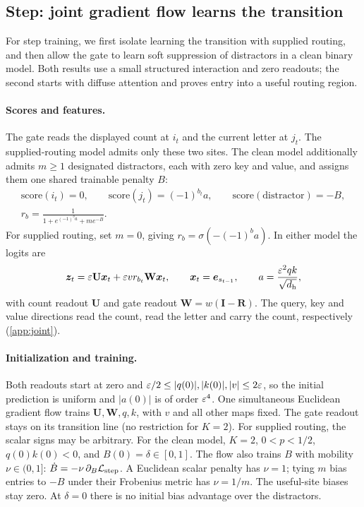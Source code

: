 \subsection{Step: joint gradient flow learns the transition}
\label{sec:step}
For step training, we first isolate learning the transition with supplied routing, and then allow the gate to learn
soft suppression of distractors in a clean binary model. Both results use a small structured interaction and zero readouts;
the second starts with diffuse attention and proves entry into a useful routing region.

\paragraph{Scores and features.} The gate reads the displayed count at $i_t$ and the current letter at $j_t$.
The supplied-routing model admits only these two sites. The clean model additionally admits $m\ge1$ designated distractors,
each with zero key and value, and assigns them one shared trainable penalty $B$:
\begin{equation}
 \begin{gathered}
 \mathrm{score}(i_t)=0,\qquad \mathrm{score}(j_t)=(-1)^{b_t}a,\qquad
 \mathrm{score}(\text{distractor})=-B,\\
 r_b=\frac{1}{1+e^{(-1)^ba}+me^{-B}}.
 \end{gathered}
 \label{eq:J-clean-scores}
\end{equation}
For supplied routing, set $m=0$, giving $r_b=\sigma(-(-1)^ba)$. In either model the logits are
\[
 \bm z_t=\varepsilon\mathbf U\bm x_t+\varepsilon v r_{b_t}\mathbf W\bm x_t,
 \qquad \bm x_t=\bm e_{s_{t-1}},\qquad a=\frac{\varepsilon^2qk}{\sqrt{d_{\mathrm h}}},
\]
with count readout $\mathbf U$ and gate readout $\mathbf W=w(\mathbf I-\mathbf R)$.
The query, key and value directions read the count, read the letter and carry the count, respectively
(\cref{app:joint}).

\paragraph{Initialization and training.} Both readouts start at zero and
$\varepsilon/2\le |q(0)|,|k(0)|,|v|\le2\varepsilon$, so the initial prediction is uniform and
$|a(0)|$ is of order $\varepsilon^4$. One simultaneous Euclidean gradient flow trains $\mathbf U,\mathbf W,q,k$,
with $v$ and all other maps fixed. The gate readout stays on its transition line (no restriction for $K=2$).
For supplied routing, the scalar signs may be arbitrary. For the clean model, $K=2$, $0<p<1/2$,
$q(0)k(0)<0$, and $B(0)=\delta\in[0,1]$. The flow also trains $B$ with mobility $\nu\in(0,1]$:
$\dot B=-\nu\,\partial_B\mathcal L_{\mathrm{step}}$. A Euclidean scalar penalty has $\nu=1$;
tying $m$ bias entries to $-B$ under their Frobenius metric has $\nu=1/m$.
The useful-site biases stay zero. At $\delta=0$ there is no initial bias advantage over the distractors.

